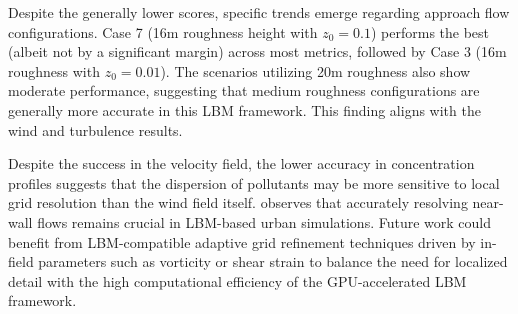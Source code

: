 Despite the generally lower scores, specific trends emerge regarding approach flow configurations. Case 7 (16m roughness height with $z_0 = 0.1$) performs the best (albeit not by a significant margin) across most metrics, followed by Case 3 (16m roughness with $z_0 = 0.01$). The scenarios utilizing 20m roughness also show moderate performance, suggesting that medium roughness configurations are generally more accurate in this LBM framework. This finding aligns with the wind and turbulence results.

Despite the success in the velocity field, the lower accuracy in concentration profiles suggests that the dispersion of pollutants may be more sensitive to local grid resolution than the wind field itself. \textcite{Hu2025} observes that accurately resolving near-wall flows remains crucial in LBM-based urban simulations. Future work could benefit from LBM-compatible adaptive grid refinement techniques driven by in-field parameters such as vorticity or shear strain to balance the need for localized detail with the high computational efficiency of the GPU-accelerated LBM framework.

\newpage